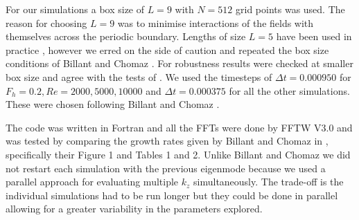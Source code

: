 
For our simulations a box size of $L=9$ with $N=512$ grid points was used. The reason for choosing $L=9$ was to minimise interactions of the fields with themselves across the periodic boundary. Lengths of size $L=5$ have been used in practice \cite{augier2012}, however we erred on the side of caution and repeated the box size conditions of Billant and Chomaz \cite{bc2000c}. For robustness results were checked at smaller box size and agree with the tests of \cite{bc2000c}. We used the timesteps of $\Delta t=0.000950$ for $F_{h}=0.2,Re=2000,5000,10000$ and $\Delta t=0.000375$ for all the other simulations. These were chosen following Billant and Chomaz \cite{bc2000c}. 


The code was written in Fortran and all the FFTs were done by FFTW V3.0\cite{fftw} and was tested by comparing the growth rates given by Billant and Chomaz in \cite{bc2000c}, specifically their Figure  1 and Tables 1 and 2. Unlike Billant and Chomaz \cite{bc2000c} we did not restart each simulation with the previous eigenmode because we used a parallel approach for evaluating multiple $k_{z}$ simultaneously. The trade-off is the individual simulations had to be run longer but they could be done in parallel allowing for a greater variability in the parameters explored. 



